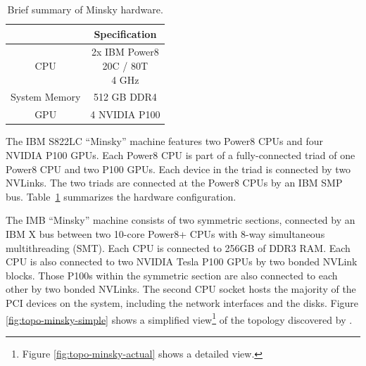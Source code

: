 \begin{table}[]
    \centering
    \caption[Minsky hardware summary.]{
        Brief summary of Minsky hardware.
        }
    \label{tab:minsky}
    \begin{tabular}{|c|c|}
    \hline
    \textbf{} & \textbf{Specification}                  \\ \hline
    CPU               &  \makecell{2x IBM Power8 \\ 20C / 80T \\ 4 GHz}  \\ \hline
    System Memory     &  512 GB DDR4                          \\ \hline
    GPU               &  4 NVIDIA P100                        \\ \hline
    \end{tabular}
\end{table}

The IBM S822LC ``Minsky'' machine features two Power8 CPUs and four NVIDIA P100 GPUs.
Each Power8 CPU is part of a fully-connected triad of one Power8 CPU and two P100 GPUs.
Each device in the triad is connected by two NVLinks.
The two triads are connected at the Power8 CPUs by an IBM SMP bus.
Table~\ref{tab:minsky} summarizes the hardware configuration.

The IMB ``Minsky'' machine consists of two symmetric sections, connected by an IBM X bus between two 10-core Power8+ CPUs with 8-way simultaneous multithreading (SMT).
Each CPU is connected to 256GB of DDR3 RAM.
Each CPU is also connected to two NVIDIA Tesla P100 GPUs by two bonded NVLink blocks.
Those P100s within the symmetric section are also connected to each other by two bonded NVLinks.
The second CPU socket hosts the majority of the PCI devices on the system, including the network interfaces and the disks.
Figure \ref{fig:topo-minsky-simple} shows a simplified view\footnote{Figure \ref{fig:topo-minsky-actual} shows a detailed view.} of the topology discovered by .


